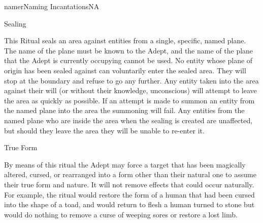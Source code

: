 \begin{college}[2.0]{namer}{Naming Incantations}{NA}
\begin{ritual}[R-5]{Sealing}
\begin{effects}
This Ritual seals an area against entities from a single, specific,
named plane. The name of the plane must be known to the Adept, and the
name of the plane that the Adept is currently occupying cannot be
used. No entity whose plane of origin has been sealed against can
voluntarily enter the sealed area. They will stop at the boundary and
refuse to go any further. Any entity taken into the area against their
will (or without their knowledge, \eg unconscious) will attempt to
leave the area as quickly as possible. If an attempt is made to summon
an entity from the named plane into the area the summoning will
fail. Any entities from the named plane who are inside the area when
the sealing is created are unaffected, but should they leave the area
they will be unable to re-enter it.
\end{effects}
\end{ritual}

\begin{ritual}[R-6]{True Form}
\begin{effects}
By means of this ritual the Adept may force a target that has been
magically altered, cursed, or rearranged into a form other than their
natural one to assume their true form and nature. It will not remove
effects that could occur naturally. For example, the ritual would
restore the form of a human that had been cursed into the shape of a
toad, and would return to flesh a human turned to stone but would do
nothing to remove a curse of weeping sores or restore a lost limb.
\end{effects}
\end{ritual}


\end{college}
